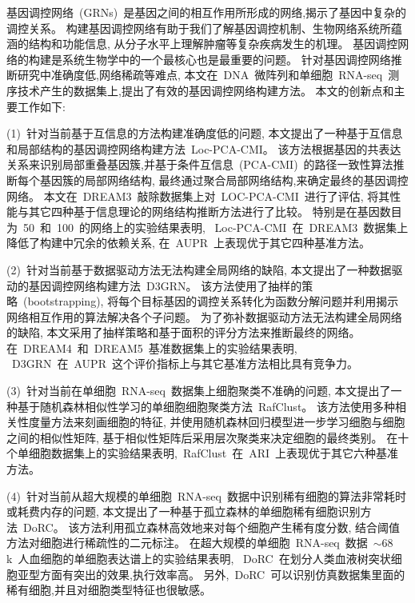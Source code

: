 \begin{abstractcn}\setlength{\baselineskip}{20pt}%
基因调控网络~(GRNs)~是基因之间的相互作用所形成的网络,揭示了基因中复杂的调控关系。
构建基因调控网络有助于我们了解基因调控机制、生物网络系统所蕴涵的结构和功能信息,
从分子水平上理解肿瘤等复杂疾病发生的机理。
基因调控网络的构建是系统生物学中的一个最核心也是最重要的问题。
针对基因调控网络推断研究中准确度低,网络稀疏等难点, 
本文在~DNA~微阵列和单细胞~RNA-seq~测序技术产生的数据集上,提出了有效的基因调控网络构建方法。
本文的创新点和主要工作如下:

(1)~针对当前基于互信息的方法构建准确度低的问题,
本文提出了一种基于互信息和局部结构的基因调控网络构建方法~Loc-PCA-CMI。
该方法根据基因的共表达关系来识别局部重叠基因簇,并基于条件互信息~(PCA-CMI)~的路径一致性算法推断每个基因簇的局部网络结构,
最终通过聚合局部网络结构,来确定最终的基因调控网络。
本文在~DREAM3~敲除数据集上对~LOC-PCA-CMI~进行了评估,
将其性能与其它四种基于信息理论的网络结构推断方法进行了比较。
特别是在基因数目为~50~和~100~的网络上的实验结果表明,
~Loc-PCA-CMI~在~DREAM3~数据集上降低了构建中冗余的依赖关系,
在~AUPR~上表现优于其它四种基准方法。

(2)~针对当前基于数据驱动方法无法构建全局网络的缺陷,
本文提出了一种数据驱动的基因调控网络构建方法~D3GRN。
该方法使用了抽样的策略~(bootstrapping),
将每个目标基因的调控关系转化为函数分解问题并利用揭示网络相互作用的算法解决各个子问题。
为了弥补数据驱动方法无法构建全局网络的缺陷,
本文采用了抽样策略和基于面积的评分方法来推断最终的网络。
在~DREAM4~和~DREAM5~基准数据集上的实验结果表明,
~D3GRN~在~AUPR~这个评价指标上与其它基准方法相比具有竞争力。

(3)~针对当前在单细胞~RNA-seq~数据集上细胞聚类不准确的问题,
本文提出了一种基于随机森林相似性学习的单细胞细胞聚类方法~RafClust。
该方法使用多种相关性度量方法来刻画细胞的特征, 
并使用随机森林回归模型进一步学习细胞与细胞之间的相似性矩阵,
基于相似性矩阵后采用层次聚类来决定细胞的最终类别。
在十个单细胞数据集上的实验结果表明,~RafClust~在~ARI~上表现优于其它六种基准方法。

(4)~针对当前从超大规模的单细胞~RNA-seq~数据中识别稀有细胞的算法非常耗时或耗费内存的问题,
本文提出了一种基于孤立森林的单细胞稀有细胞识别方法~DoRC。
该方法利用孤立森林高效地来对每个细胞产生稀有度分数,
结合阈值方法对细胞进行稀疏性的二元标注。
在超大规模的单细胞~RNA-seq~数据~${\sim}68$k~人血细胞的单细胞表达谱上的实验结果表明,
~DoRC~在划分人类血液树突状细胞亚型方面有突出的效果,执行效率高。
另外,~DoRC~可以识别仿真数据集里面的稀有细胞,并且对细胞类型特征也很敏感。


\end{abstractcn}
